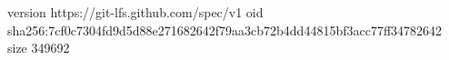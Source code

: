 version https://git-lfs.github.com/spec/v1
oid sha256:7cf0c7304fd9d5d88e271682642f79aa3cb72b4dd44815bf3acc77ff34782642
size 349692
